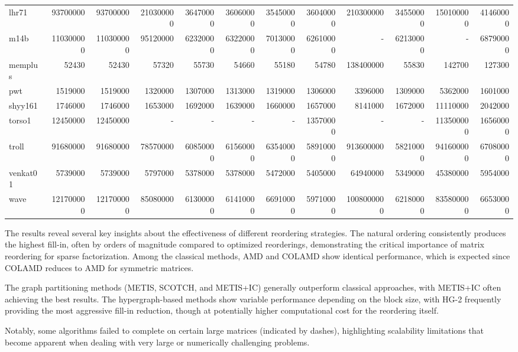\begin{table}[h]
{{\begin{tabular}{|l|r|r|r|r|r|r|r|r|r|r|r|}
lhr71 & 93700000 & 93700000 & 210300000 & 36470000 & 36060000 & 35450000 & 36040000 & 210300000 & 34550000 & 150100000 & 41460000 \\
m14b & 110300000 & 110300000 & 95120000 & 62320000 & 63220000 & 70130000 & 62610000 & - & 62130000 & - & 68790000 \\
memplus & 52430 & 52430 & 57320 & 55730 & 54660 & 55180 & 54780 & 138400000 & 55830 & 142700 & 127300 \\
pwt & 1519000 & 1519000 & 1320000 & 1307000 & 1313000 & 1319000 & 1306000 & 3396000 & 1309000 & 5362000 & 1601000 \\
shyy161 & 1746000 & 1746000 & 1653000 & 1692000 & 1639000 & 1660000 & 1657000 & 8141000 & 1672000 & 11110000 & 2042000 \\
torso1 & 12450000 & 12450000 & - & - & - & - & 13570000 & - & - & 113500000 & 16560000 \\
troll & 91680000 & 91680000 & 78570000 & 60850000 & 61560000 & 63540000 & 58910000 & 913600000 & 58210000 & 941600000 & 67080000 \\
venkat01 & 5739000 & 5739000 & 5797000 & 5378000 & 5378000 & 5472000 & 5405000 & 64940000 & 5349000 & 45380000 & 5954000 \\
wave & 121700000 & 121700000 & 85080000 & 61300000 & 61410000 & 66910000 & 59710000 & 1008000000 & 62180000 & 835800000 & 66530000 \\
\hline
\end{tabular}%
}%
}
\end{table}


The results reveal several key insights about the effectiveness of different reordering strategies. The natural ordering consistently produces the highest fill-in, often by orders of magnitude compared to optimized reorderings, demonstrating the critical importance of matrix reordering for sparse factorization. Among the classical methods, AMD and COLAMD show identical performance, which is expected since COLAMD reduces to AMD for symmetric matrices.

The graph partitioning methods (METIS, SCOTCH, and METIS+IC) generally outperform classical approaches, with METIS+IC often achieving the best results. The hypergraph-based methods show variable performance depending on the block size, with HG-2 frequently providing the most aggressive fill-in reduction, though at potentially higher computational cost for the reordering itself.

Notably, some algorithms failed to complete on certain large matrices (indicated by dashes), highlighting scalability limitations that become apparent when dealing with very large or numerically challenging problems.



